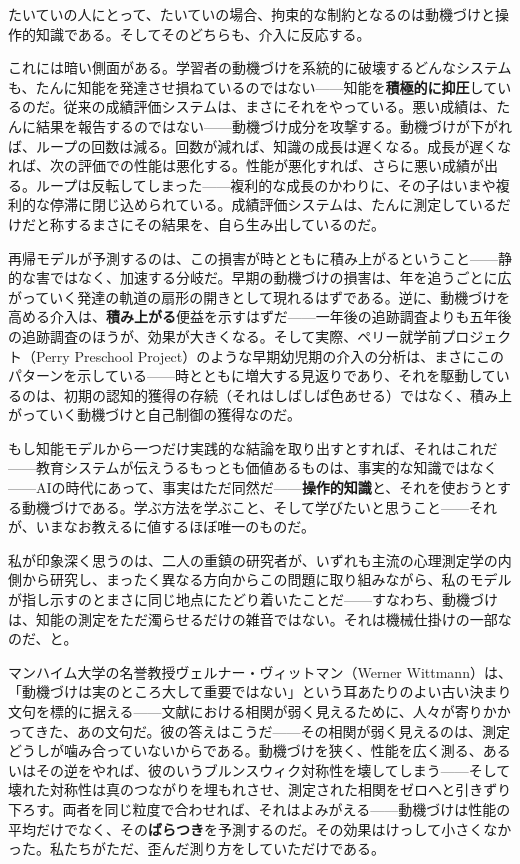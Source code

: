 \documentclass[11pt, twoside, openright]{book}
\begin{document}
たいていの人にとって、たいていの場合、拘束的な制約となるのは動機づけと操作的知識である。そしてそのどちらも、介入に反応する。

これには暗い側面がある。学習者の動機づけを系統的に破壊するどんなシステムも、たんに知能を発達させ損ねているのではない------知能を\textbf{積極的に抑圧}しているのだ。従来の成績評価システムは、まさにそれをやっている。悪い成績は、たんに結果を報告するのではない------動機づけ成分を攻撃する。動機づけが下がれば、ループの回数は減る。回数が減れば、知識の成長は遅くなる。成長が遅くなれば、次の評価での性能は悪化する。性能が悪化すれば、さらに悪い成績が出る。ループは反転してしまった------複利的な成長のかわりに、その子はいまや複利的な停滞に閉じ込められている。成績評価システムは、たんに測定しているだけだと称するまさにその結果を、自ら生み出しているのだ。

再帰モデルが予測するのは、この損害が時とともに積み上がるということ------静的な害ではなく、加速する分岐だ。早期の動機づけの損害は、年を追うごとに広がっていく発達の軌道の扇形の開きとして現れるはずである。逆に、動機づけを高める介入は、\textbf{積み上がる}便益を示すはずだ------一年後の追跡調査よりも五年後の追跡調査のほうが、効果が大きくなる。そして実際、ペリー就学前プロジェクト（Perry Preschool Project）のような早期幼児期の介入の分析は、まさにこのパターンを示している------時とともに増大する見返りであり、それを駆動しているのは、初期の認知的獲得の存続（それはしばしば色あせる）ではなく、積み上がっていく動機づけと自己制御の獲得なのだ。

もし知能モデルから一つだけ実践的な結論を取り出すとすれば、それはこれだ------教育システムが伝えうるもっとも価値あるものは、事実的な知識ではなく------AIの時代にあって、事実はただ同然だ------\textbf{操作的知識}と、それを使おうとする動機づけである。学ぶ方法を学ぶこと、そして学びたいと思うこと------それが、いまなお教えるに値するほぼ唯一のものだ。

私が印象深く思うのは、二人の重鎮の研究者が、いずれも主流の心理測定学の内側から研究し、まったく異なる方向からこの問題に取り組みながら、私のモデルが指し示すのとまさに同じ地点にたどり着いたことだ------すなわち、動機づけは、知能の測定をただ濁らせるだけの雑音ではない。それは機械仕掛けの一部なのだ、と。

マンハイム大学の名誉教授ヴェルナー・ヴィットマン（Werner Wittmann）は、「動機づけは実のところ大して重要ではない」という耳あたりのよい古い決まり文句を標的に据える------文献における相関が弱く見えるために、人々が寄りかかってきた、あの文句だ。彼の答えはこうだ------その相関が弱く見えるのは、測定どうしが噛み合っていないからである。動機づけを狭く、性能を広く測る、あるいはその逆をやれば、彼のいうブルンスウィク対称性を壊してしまう------そして壊れた対称性は真のつながりを埋もれさせ、測定された相関をゼロへと引きずり下ろす。両者を同じ粒度で合わせれば、それはよみがえる------動機づけは性能の平均だけでなく、その\textbf{ばらつき}を予測するのだ。その効果はけっして小さくなかった。私たちがただ、歪んだ測り方をしていただけである。
\end{document}
